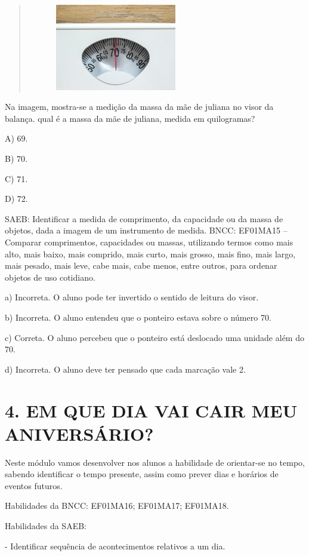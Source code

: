 \begin{quote}
\includegraphics[width=3.03770in,height=1.48580in]{media/image33.jpg}
\end{quote}

Na imagem, mostra-se a medição da massa da mãe de juliana no visor da
balança. qual é a massa da mãe de juliana, medida em quilogramas?

A) 69.

B) 70.

C) 71.

D) 72.

SAEB: Identificar a medida de comprimento, da capacidade ou da
massa de objetos, dada a imagem de um instrumento de medida.
BNCC: EF01MA15 -- Comparar comprimentos, capacidades ou massas,
utilizando termos como mais alto, mais baixo, mais comprido, mais curto,
mais grosso, mais fino, mais largo, mais pesado, mais leve, cabe mais,
cabe menos, entre outros, para ordenar objetos de uso cotidiano.

a) Incorreta. O aluno pode ter invertido o sentido de leitura do visor.

b) Incorreta. O aluno entendeu que o ponteiro estava sobre o número 70.

c) Correta. O aluno percebeu que o ponteiro está deslocado uma unidade
além do 70.

d) Incorreta. O aluno deve ter pensado que cada marcação vale 2.

\section{4. EM QUE DIA VAI CAIR MEU ANIVERSÁRIO?
}\label{muxf3dulo-4-em-que-dia-vai-cair-meu-aniversuxe1rio}

Neste módulo vamos desenvolver nos alunos a habilidade de orientar-se no
tempo, sabendo identificar o tempo presente, assim como prever dias e
horários de eventos futuros.

Habilidades da BNCC: EF01MA16; EF01MA17; EF01MA18.

Habilidades da SAEB:

- Identificar sequência de acontecimentos relativos a um dia.


